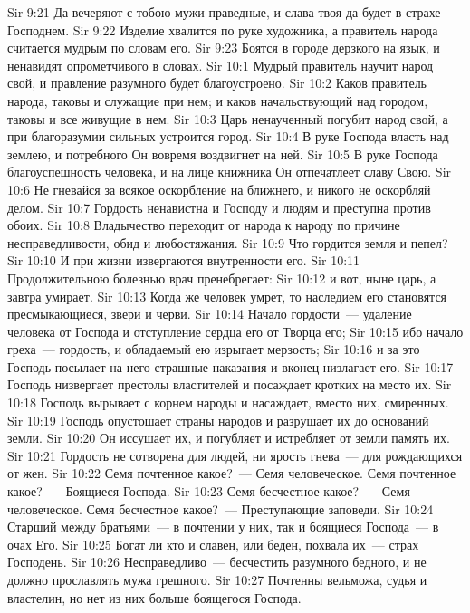 \vs Sir 9:21 Да вечеряют с тобою мужи праведные, и слава твоя да будет в страхе Господнем.
\vs Sir 9:22 Изделие хвалится по руке художника, а правитель народа считается мудрым по словам его.
\vs Sir 9:23 Боятся в городе дерзкого на язык, и ненавидят опрометчивого в словах.
\vs Sir 10:1 Мудрый правитель научит народ свой, и правление разумного будет благоустроено.
\vs Sir 10:2 Каков правитель народа, таковы и служащие при нем; и каков начальствующий над городом, таковы и все живущие в нем.
\vs Sir 10:3 Царь ненаученный погубит народ свой, а при благоразумии сильных устроится город.
\vs Sir 10:4 В руке Господа власть над землею, и  потребного Он вовремя воздвигнет на ней.
\vs Sir 10:5 В руке Господа благоуспешность человека, и на лице книжника Он отпечатлеет славу Свою.
\vs Sir 10:6 Не гневайся за всякое оскорбление на ближнего, и никого не оскорбляй делом.
\vs Sir 10:7 Гордость ненавистна и Господу и людям и преступна против обоих.
\vs Sir 10:8 Владычество переходит от народа к народу по причине несправедливости, обид и любостяжания.
\vs Sir 10:9 Что гордится земля и пепел?
\vs Sir 10:10 И при жизни извергаются внутренности его.
\vs Sir 10:11 Продолжительною болезнью врач пренебрегает:
\vs Sir 10:12 и вот, ныне царь, а завтра умирает.
\vs Sir 10:13 Когда же человек умрет, то наследием его становятся пресмыкающиеся, звери и черви.
\vs Sir 10:14 Начало гордости~--- удаление человека от Господа и отступление сердца его от Творца его;
\vs Sir 10:15 ибо начало греха~--- гордость, и обладаемый ею изрыгает мерзость;
\vs Sir 10:16 и за это Господь посылает на него страшные наказания и вконец низлагает его.
\vs Sir 10:17 Господь низвергает престолы властителей и посаждает кротких на место их.
\vs Sir 10:18 Господь вырывает с корнем народы и насаждает, вместо них, смиренных.
\vs Sir 10:19 Господь опустошает страны народов и разрушает их до оснований земли.
\vs Sir 10:20 Он иссушает их, и погубляет  и истребляет от земли память их.
\vs Sir 10:21 Гордость не сотворена для людей, ни ярость гнева~--- для рождающихся от жен.
\rsbpar\vs Sir 10:22 Семя почтенное какое?~--- Семя человеческое. Семя почтенное какое?~--- Боящиеся Господа.
\vs Sir 10:23 Семя бесчестное какое?~--- Семя человеческое. Семя бесчестное какое?~--- Преступающие заповеди.
\vs Sir 10:24 Старший между братьями~--- в почтении у них, так и боящиеся Господа~--- в очах Его.
\vs Sir 10:25 Богат ли кто и славен, или беден, похвала их~--- страх Господень.
\vs Sir 10:26 Несправедливо~--- бесчестить разумного бедного, и не должно прославлять мужа грешного.
\vs Sir 10:27 Почтенны вельможа, судья и властелин, но нет из них больше боящегося Господа.
